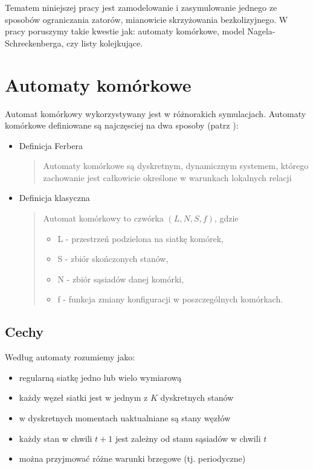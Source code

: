 \documentclass{sprawozdanie-agh}
\begin{document}
		Tematem niniejszej pracy jest zamodelowanie i zasymulowanie jednego ze sposobów ograniczania zatorów, mianowicie skrzyżowania bezkolizyjnego. W pracy poruszymy takie kwestie jak: automaty komórkowe, model Nagela-Schreckenberga, czy listy kolejkujące.

		\section{Automaty komórkowe}

		Automat komórkowy wykorzystywany jest w różnorakich symulacjach. Automaty komórkowe definiowane są najczęsciej na dwa sposoby (patrz \cite{formalizacjaDudekWas}):

		\begin{itemize}
			\item Definicja Ferbera
			\begin{quote}
				Automaty komórkowe są dyskretnym, dynamicznym systemem, którego zachowanie jest całkowicie określone w warunkach lokalnych relacji
			\end{quote}
			\item Definicja klasyczna \cite{kulakowskiWasSzpyrka}
			\begin{quote}
				Automat komórkowy to czwórka $(L,N,S,f)$, gdzie
				\begin{itemize}
					\item L - przestrzeń podzielona na siatkę komórek,
					\item S - zbiór skończonych stanów,
					\item N - zbiór sąsiadów danej komórki,
					\item f - funkcja zmiany konfiguracji w poszczególnych komórkach.
				\end{itemize}
			\end{quote}
		\end{itemize}

			\subsection{Cechy}

			Według \cite{automatyZygierewicz} automaty rozumiemy jako:
			\begin{itemize}
				\item regularną siatkę jedno lub wielo wymiarową
				\item każdy węzeł siatki jest w jednym z $ K $ dyskretnych stanów
				\item w dyskretnych momentach uaktualniane są stany węzłów
				\item każdy stan w chwili $ t+1 $ jest zależny od stanu sąsiadów w chwili $ t $
				\item można przyjmować różne warunki brzegowe (tj. periodyczne)
			\end{itemize}
\end{document}
